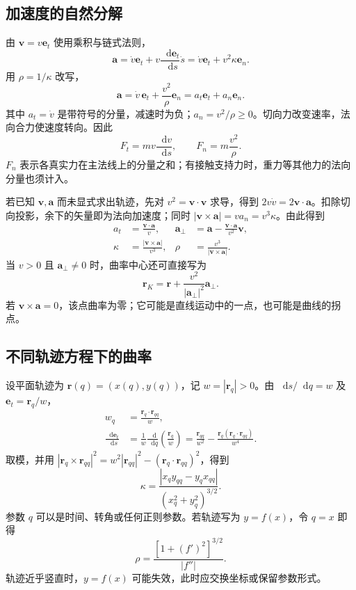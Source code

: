 \documentclass[11pt,openany,fontset=fandol]{ctexbook}
\theoremstyle{definition}\newtheorem{example}{例}[chapter]\newtheorem{exercise}{习题}[chapter]
\newcommand{\dd}{\mathop{}\!\mathrm d}\newcommand{\ee}{\mathrm e}\newcommand{\vct}[1]{\bm{#1}}
\begin{document}
\subsection{加速度的自然分解}
由 $\vct v=v\vct e_t$ 使用乘积与链式法则，
\[
\vct a=\dot v\vct e_t+v\frac{\dd\vct e_t}{\dd s}\dot s
=\dot v\vct e_t+v^2\kappa\vct e_n.
\]
用 $\rho=1/\kappa$ 改写，
\begin{equation}\label{mp3:eq:l3-natural-a}
\vct a=\dot v\,\vct e_t+\frac{v^2}{\rho}\vct e_n
=a_t\vct e_t+a_n\vct e_n.
\end{equation}
其中 $a_t=\dot v$ 是带符号的分量，减速时为负；$a_n=v^2/\rho\ge0$。切向力改变速率，法向合力使速度转向。因此
\[
F_t=m v\frac{\dd v}{\dd s},\qquad F_n=m\frac{v^2}{\rho}.
\]
$F_n$ 表示各真实力在主法线上的分量之和；有接触支持力时，重力等其他力的法向分量也须计入。

若已知 $\vct v,\vct a$ 而未显式求出轨迹，先对 $v^2=\vct v\cdot\vct v$ 求导，得到 $2v\dot v=2\vct v\cdot\vct a$。扣除切向投影，余下的矢量即为法向加速度；同时 $|\vct v\times\vct a|=va_n=v^3\kappa$。由此得到
\begin{align}
a_t&=\frac{\vct v\cdot\vct a}{v},&
\vct a_\perp&=\vct a-\frac{\vct v\cdot\vct a}{v^2}\vct v,\label{mp3:eq:l3-proj}\\
\kappa&=\frac{|\vct v\times\vct a|}{v^3},&
\rho&=\frac{v^3}{|\vct v\times\vct a|}.\label{mp3:eq:l3-vacurv}
\end{align}
当 $v>0$ 且 $\vct a_\perp\ne0$ 时，曲率中心还可直接写为
\[
\vct r_K=\vct r+\frac{v^2}{|\vct a_\perp|^2}\vct a_\perp.
\]
若 $\vct v\times\vct a=0$，该点曲率为零；它可能是直线运动中的一点，也可能是曲线的拐点。

\subsection{不同轨迹方程下的曲率}
设平面轨迹为 $\vct r(q)=(x(q),y(q))$，记 $w=|\vct r_q|>0$。由 $\dd s/\dd q=w$ 及 $\vct e_t=\vct r_q/w$，
\[
\begin{aligned}
w_q&=\frac{\vct r_q\cdot\vct r_{qq}}w,\\
\frac{\dd\vct e_t}{\dd s}
&=\frac1w\frac{\dd}{\dd q}\left(\frac{\vct r_q}w\right)
=\frac{\vct r_{qq}}{w^2}
-\frac{\vct r_q(\vct r_q\cdot\vct r_{qq})}{w^4}.
\end{aligned}
\]
取模，并用 $|\vct r_q\times\vct r_{qq}|^2=w^2|\vct r_{qq}|^2-(\vct r_q\cdot\vct r_{qq})^2$，得到
\begin{equation}\label{mp3:eq:l3-param-curv}
\kappa=\frac{|x_qy_{qq}-y_qx_{qq}|}{(x_q^2+y_q^2)^{3/2}}.
\end{equation}
参数 $q$ 可以是时间、转角或任何正则参数。若轨迹写为 $y=f(x)$，令 $q=x$ 即得
\[
\rho=\frac{[1+(f')^2]^{3/2}}{|f''|}.
\]
轨迹近乎竖直时，$y=f(x)$ 可能失效，此时应交换坐标或保留参数形式。
\end{document}
